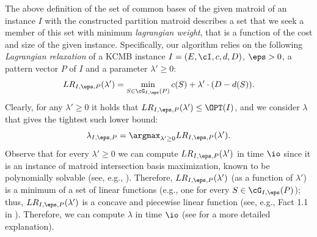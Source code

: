 The above definition of the set of common bases of the given matroid of an instance $I$ with the constructed partition matroid describes a set that we seek a member of this set with minimum {\em lagrangian weight}, that is a function of the cost and size of the given instance. Specifically, our algorithm relies on the following {\em Lagrangian relaxation} of a KCMB instance $I = (E,\cI,c,d,D)$, $\eps>0$, a pattern vector $P$ of $I$ and a parameter $\lambda' \geq 0$: \begin{equation}
	\label{eq:LR}
	LR_{I,\eps,P}(\lambda') = \min_{S \in \cG_{I,\eps}(P)} c(S)+\lambda' \cdot (D-d(S)). 
\end{equation} Clearly, for any $\lambda' \geq 0$ it holds that $LR_{I,\eps,P}(\lambda') \leq \OPT(I)$, and we consider $\lambda$ that gives the tightest such lower bound: \begin{equation}
	\label{eq:Lambda}
	\lambda_{I,\eps,P} = \argmax_{\lambda' \geq 0} LR_{I,\eps,P}(\lambda').
\end{equation} Observe that for every $\lambda' \geq 0 $ we can compute $LR_{I,\eps,P}(\lambda')$ in time $\io$ since it is an instance of matroid intersection basis maximization, known to be polynomially solvable (see, e.g., \cite{schrijver2003combinatorial}). Therefore, $LR_{I,\eps,P}(\lambda')$ (as a function of $\lambda'$) is a minimum of a set of linear functions (e.g., one for
every $S \in \cG_{I,\eps}(P)$); thus, $LR_{I,\eps,P}(\lambda')$ is a concave and piecewise linear function (see, e.g., Fact 1.1 in \cite{gusfield1983parametric}). Therefore, we can compute $\lambda$ in time $\io$ (see \cite{hassin2004efficient} for a more detailed explanation). 

